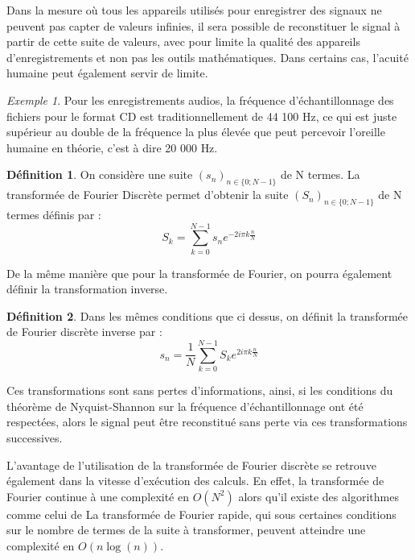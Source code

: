 \documentclass[]{article}
\theoremstyle{remark}
\newtheorem{myexmpl}{Exemple}
\theoremstyle{definition}
\newtheorem{mydef}{Définition}
\begin{document}
	Dans la mesure où tous les appareils utilisés pour enregistrer des signaux ne peuvent pas capter de valeurs infinies, il sera possible de reconstituer le signal à partir de cette suite de valeurs, avec pour limite la qualité des appareils d'enregistrements et non pas les outils mathématiques. Dans certains cas, l'acuité humaine peut également servir de limite.
	
	\begin{myexmpl}
		 Pour les enregistrements audios, la fréquence d'échantillonnage des fichiers pour le format CD est traditionnellement de 44 100 Hz, ce qui est juste supérieur au double de la fréquence la plus élevée que peut percevoir l'oreille humaine en théorie, c'est à dire 20 000 Hz. 
	\end{myexmpl}
	
	\begin{mydef}
			On considère une suite $(s_n)_{n\in \{0; N -1 \}}$ de N termes. La transformée de Fourier Discrète permet d'obtenir la suite  $(S_n)_{n\in \{0; N -1 \}}$ de N termes définis par :
			$$ S_k = \sum_{k=0}^{N-1}s_n e^{-2i\pi k\frac{n}{N}} $$
	\end{mydef}
		De la même manière que pour la transformée de Fourier, on pourra également définir la transformation inverse.
		
	\begin{mydef}
		Dans les mêmes conditions que ci dessus, on définit la transformée de Fourier discrète inverse par :
			$$ s_n =\frac{1}{N} \sum_{k=0}^{N-1}S_k e^{2i\pi k\frac{n}{N}} $$
	\end{mydef}
	
	Ces transformations sont sans pertes d'informations, ainsi, si les conditions du théorème de Nyquist-Shannon sur la fréquence d'échantillonnage ont été respectées, alors le signal peut être reconstitué sans perte via ces transformations successives. 
	
	L'avantage de l'utilisation de la transformée de Fourier discrète se retrouve également dans la vitesse d'exécution des calculs. En effet, la transformée de Fourier continue à une complexité en $O(N^2)$ alors qu'il existe des algorithmes comme celui de La transformée de Fourier rapide, qui sous certaines conditions sur le nombre de termes de la suite à transformer, peuvent atteindre une complexité en $O(n\log(n))$.
	
	
\end{document}
